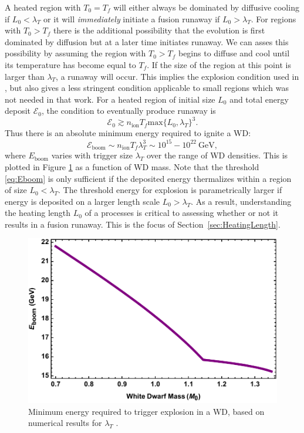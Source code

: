 \documentclass[twocolumn,showpacs,preprintnumbers,amsmath,amssymb,prd]{revtex4}
\newcommand{\Ez}{\mathcal{E}_0}
\newcommand{\GeV}{\text{GeV}}
\begin{document}
A heated region with $T_0=T_f$ will either always be dominated by diffusive cooling if $L_0 < \lambda_T$ or it will \emph{immediately} initiate a fusion runaway if $L_0 > \lambda_T$.  
For regions with $T_0 > T_f$ there is the additional possibility that the evolution is first dominated by diffusion but at a later time initiates runaway.
We can asses this possibility by assuming the region with $T_0 > T_f$ begins to diffuse and cool until its temperature has become equal to $T_f$.
If the size of the region at this point is larger than $\lambda_T$, a runaway will occur.  
This implies the explosion condition used in \cite{Graham:2015apa}, but also gives a less stringent condition applicable to small regions which was not needed in that work.  
For a heated region of initial size $L_0$ and total energy deposit $\Ez$, the condition to eventually produce runaway is
\begin{equation}
\label{eq:boom}
  \Ez \gtrsim n_\text{ion} T_f \text{max}\{L_0, \lambda_T\}^3.
\end{equation}
Thus there is an absolute minimum energy required to ignite a WD:
\begin{equation}
\label{eq:Eboom}
\mathcal{E}_{\text{boom}} \sim n_\text{ion} T_f \lambda_T^3 \sim 10^{15} - 10^{22} ~\GeV,
\end{equation}
where $E_\text{boom}$ varies with trigger size $\lambda_T$ over the range of WD densities.
This is plotted in Figure \ref{fig:Eboom} as a function of WD mass.
Note that the threshold \eqref{eq:Eboom} is only sufficient if the deposited energy thermalizes within a region of size $L_0 < \lambda_T$.
The threshold energy for explosion is parametrically larger if energy is deposited on a larger length scale $L_0 > \lambda_T$.
As a result, understanding the heating length $L_0$ of a processes is critical to assessing whether or not it results in a fusion runaway.
This is the focus of Section~\ref{sec:HeatingLength}.

\begin{figure}
\includegraphics[scale=.45]{Eboom.pdf}
\caption{Minimum energy required to trigger explosion in a WD, based on numerical results for $\lambda_T$ \cite{Woosley}.}
\label{fig:Eboom}
\end{figure}
\end{document}
